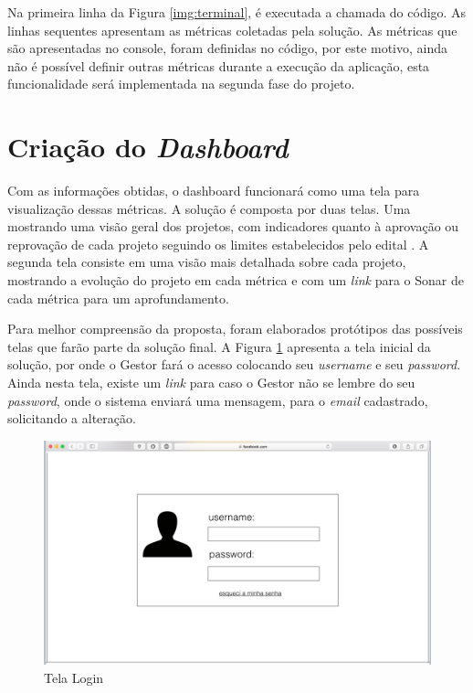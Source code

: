 Na primeira linha da Figura \ref{img:terminal}, é executada a chamada do código. As linhas sequentes apresentam as métricas coletadas pela solução. As métricas que são apresentadas no console, foram definidas no código, por este motivo, ainda não é possível definir outras métricas durante a execução da aplicação, esta funcionalidade será implementada na segunda fase do projeto.  

\section{Criação do \textit{Dashboard}}
Com as informações obtidas, o dashboard funcionará como uma tela para visualização dessas métricas. A solução é composta por duas telas. Uma mostrando uma visão geral dos projetos, com indicadores quanto à aprovação ou reprovação de cada projeto seguindo os limites estabelecidos pelo edital \cite{edital}. A segunda tela consiste em uma visão mais detalhada sobre cada projeto, mostrando a evolução do projeto em cada métrica e com um \textit{link} para o Sonar de cada métrica para um aprofundamento.

Para melhor compreensão da proposta, foram elaborados protótipos das possíveis telas que farão parte da solução final. A Figura \ref{img:telaLogin} apresenta a tela inicial da solução, por onde o Gestor fará o acesso colocando seu \textit{username} e seu \textit{password}. Ainda nesta tela, existe um \textit{link} para caso o Gestor não se lembre do seu \textit{password}, onde o sistema enviará uma mensagem, para o \textit{email} cadastrado, solicitando a alteração.

\graphicspath{{figuras/}}
\begin{figure}
\centering
\includegraphics[scale=0.60]{telaLogin.png}
\caption{Tela Login}
\label{img:telaLogin}
\end{figure}

